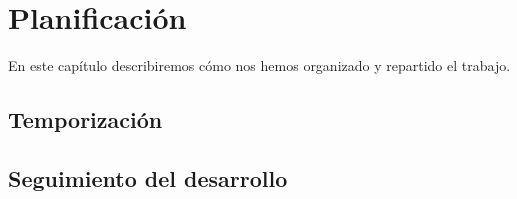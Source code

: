 \chapter{Planificación}
En este capítulo describiremos cómo nos hemos organizado y repartido el trabajo.

\section{Temporización}

\section{Seguimiento del desarrollo}
